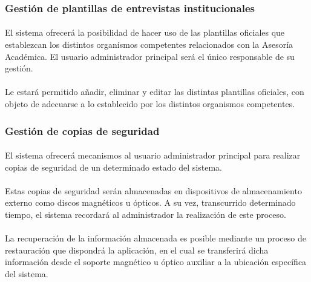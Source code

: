       \subsubsection{Gestión de plantillas de entrevistas institucionales}

      \paragraph{}El sistema ofrecerá la posibilidad de hacer uso de las
      plantillas oficiales que establezcan los distintos organismos competentes
      relacionados con la Asesoría Académica. El usuario administrador principal
      será el único responsable de su gestión.

      \paragraph{}Le estará permitido añadir, eliminar y editar las distintas
      plantillas oficiales, con objeto de adecuarse a lo establecido por los
      distintos organismos competentes.

      \subsubsection{Gestión de copias de seguridad}

      \paragraph{}El sistema ofrecerá mecanismos al usuario administrador
      principal para realizar copias de seguridad de un determinado estado del
      sistema.

      \paragraph{}Estas copias de seguridad serán almacenadas en dispositivos
      de almacenamiento externo como discos magnéticos u ópticos. A su vez,
      transcurrido determinado tiempo, el sistema recordará al administrador
      la realización de este proceso.

      \paragraph{}La recuperación de la información almacenada es posible
      mediante un proceso de restauración que dispondrá la aplicación, en el
      cual se transferirá dicha información desde el soporte magnético u
      óptico auxiliar a la ubicación específica del sistema.

